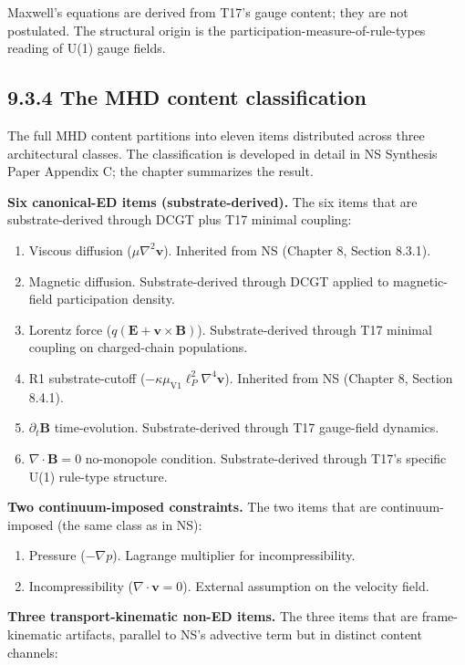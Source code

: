 \documentclass[11pt]{book}
\begin{document}
Maxwell's equations are derived from T17's gauge content; they are not postulated. The structural origin is the participation-measure-of-rule-types reading of U(1) gauge fields.

\subsection{9.3.4 The MHD content classification}

The full MHD content partitions into eleven items distributed across three architectural classes. The classification is developed in detail in NS Synthesis Paper Appendix C; the chapter summarizes the result.

\textbf{Six canonical-ED items (substrate-derived).} The six items that are substrate-derived through DCGT plus T17 minimal coupling:

\begin{enumerate}
\item Viscous diffusion ($\mu\nabla^2\mathbf{v}$). Inherited from NS (Chapter 8, Section 8.3.1).
\item Magnetic diffusion. Substrate-derived through DCGT applied to magnetic-field participation density.
\item Lorentz force ($q(\mathbf{E} + \mathbf{v}\times\mathbf{B})$). Substrate-derived through T17 minimal coupling on charged-chain populations.
\item R1 substrate-cutoff ($-\kappa\mu_{\mathrm{V1}}\ell_P^2\nabla^4\mathbf{v}$). Inherited from NS (Chapter 8, Section 8.4.1).
\item $\partial_t\mathbf{B}$ time-evolution. Substrate-derived through T17 gauge-field dynamics.
\item $\nabla\cdot\mathbf{B} = 0$ no-monopole condition. Substrate-derived through T17's specific U(1) rule-type structure.
\end{enumerate}

\textbf{Two continuum-imposed constraints.} The two items that are continuum-imposed (the same class as in NS):

\begin{enumerate}
\item Pressure ($-\nabla p$). Lagrange multiplier for incompressibility.
\item Incompressibility ($\nabla\cdot\mathbf{v} = 0$). External assumption on the velocity field.
\end{enumerate}

\textbf{Three transport-kinematic non-ED items.} The three items that are frame-kinematic artifacts, parallel to NS's advective term but in distinct content channels:
\end{document}
